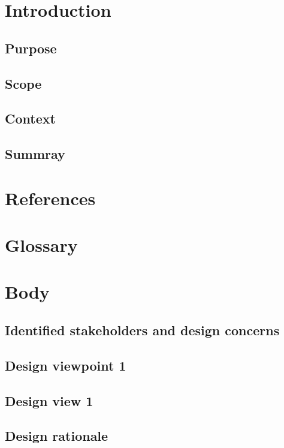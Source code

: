 \documentclass[12pt]{article}
\begin{document}
\section{Introduction}   
    \subsection{Purpose}
    \subsection{Scope}
    \subsection{Context}
    \subsection{Summray}

\section{References}

\section{Glossary}

\section{Body}
    \subsection{Identified stakeholders and design concerns}
    \subsection{Design viewpoint 1}
    \subsection{Design view 1}
    \subsection{Design rationale}
\end{document}
